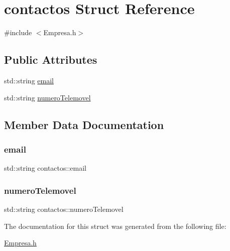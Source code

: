 \hypertarget{structcontactos}{}\section{contactos Struct Reference}
\label{structcontactos}


{\ttfamily \#include $<$Empresa.\+h$>$}

\subsection*{Public Attributes}
\begin{DoxyCompactItemize}
\item 
std\+::string \mbox{\hyperlink{structcontactos_a86c1ad3bcc23dbb8bf7bb37ae0976242}{email}}
\item 
std\+::string \mbox{\hyperlink{structcontactos_a09e1d4029e1eb91fc9ec76e4b4b6d48a}{numero\+Telemovel}}
\end{DoxyCompactItemize}


\subsection{Member Data Documentation}
\mbox{\label{structcontactos_a86c1ad3bcc23dbb8bf7bb37ae0976242}} 
\subsubsection{\texorpdfstring{email}{email}}
{\footnotesize\ttfamily std\+::string contactos\+::email}

\mbox{\label{structcontactos_a09e1d4029e1eb91fc9ec76e4b4b6d48a}} 
\subsubsection{\texorpdfstring{numero\+Telemovel}{numeroTelemovel}}
{\footnotesize\ttfamily std\+::string contactos\+::numero\+Telemovel}



The documentation for this struct was generated from the following file\+:\begin{DoxyCompactItemize}
\item 
\mbox{\hyperlink{_empresa_8h}{Empresa.\+h}}\end{DoxyCompactItemize}
